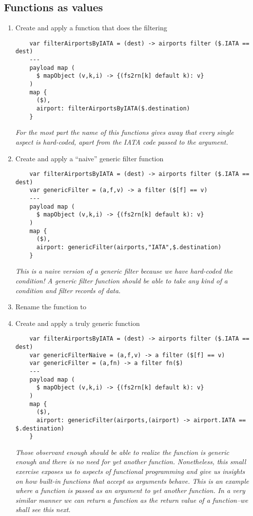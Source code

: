 \subsection{Functions as values}
\begin{enumerate}[resume*]
\item Create and apply a function that does the filtering
  \begin{verbatim}
    var filterAirportsByIATA = (dest) -> airports filter ($.IATA == dest)
    ---
    payload map (
      $ mapObject (v,k,i) -> {(fs2rn[k] default k): v}
    )
    map {
      ($),
      airport: filterAirportsByIATA($.destination)
    }
  \end{verbatim}
  \emph{
    For the most part the name of this functions gives away that every single aspect is hard-coded, apart from the IATA code passed to the  argument.
  }
\item Create and apply a ``naive'' generic filter function
  \begin{verbatim}
    var filterAirportsByIATA = (dest) -> airports filter ($.IATA == dest)
    var genericFilter = (a,f,v) -> a filter ($[f] == v)
    ---
    payload map (
      $ mapObject (v,k,i) -> {(fs2rn[k] default k): v}
    )
    map {
      ($),
      airport: genericFilter(airports,"IATA",$.destination)
    }
  \end{verbatim}
  \emph{
    This is a naive version of a generic filter because we have hard-coded the condition!  A generic filter function should be able to take any kind of a  condition and filter records of data.
  }
\item Rename the  function to 
\item Create and apply a truly generic function
  \begin{verbatim}
    var filterAirportsByIATA = (dest) -> airports filter ($.IATA == dest)
    var genericFilterNaive = (a,f,v) -> a filter ($[f] == v)
    var genericFilter = (a,fn) -> a filter fn($)
    ---
    payload map (
      $ mapObject (v,k,i) -> {(fs2rn[k] default k): v}
    )
    map {
      ($),
      airport: genericFilter(airports,(airport) -> airport.IATA == $.destination)
    }
  \end{verbatim}
  \emph{
    Those observant enough should be able to realize the  function is generic enough and there is no need for yet another function.  Nonetheless, this small exercise exposes us to aspects of functional programming and give us insights on how built-in functions that accept \lep{} as arguments behave.
    \newline
    This is an example where a function is passed as an argument to yet another function.  In a very similar manner we can return a function as the return value of a function--we shall see this next.
  }
\end{enumerate}

